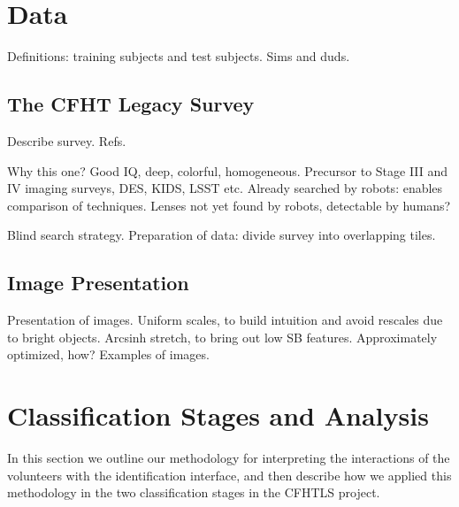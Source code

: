 \documentclass[useAMS,usenatbib,a4paper]{mn2e}
\begin{document}

\section{Data}
\label{sec:data}

Definitions: training subjects and test subjects. Sims and duds.


\subsection{The CFHT Legacy Survey}
\label{sec:data:CFHTLS}

Describe survey. Refs. 

Why this one? Good IQ, deep, colorful, homogeneous. Precursor to Stage III and
IV imaging surveys, DES, KIDS, LSST etc. Already searched by robots: enables
comparison of techniques. Lenses not yet found by robots, detectable by
humans? 

Blind search strategy.
Preparation of data: divide survey into overlapping tiles. 



\subsection{Image Presentation}
\label{sec:data:display}

Presentation of images. Uniform scales, to build intuition and avoid rescales
due to bright objects. Arcsinh stretch, to bring out low SB features. 
Approximately optimized, how? Examples of images.



\section{Classification Stages and Analysis}
\label{sec:swap}

In this section we outline our methodology for interpreting the interactions
of the volunteers with the identification interface, and then describe how we
applied this methodology in the two classification stages in the CFHTLS
project.
\end{document}
